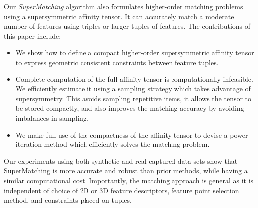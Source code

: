 Our \emph{SuperMatching} algorithm also formulates higher-order matching problems using a supersymmetric affinity tensor. It can accurately match a moderate number
of features using triples or larger tuples of features.
The contributions of this paper include:
\begin{itemize}
\item We show how to define a compact higher-order supersymmetric affinity tensor to express geometric consistent constraints between feature tuples.

\item Complete computation of the full affinity tensor is computationally infeasible. We efficiently estimate it using a sampling strategy which takes advantage of supersymmetry. This avoids sampling repetitive items, it allows the tensor to be stored compactly, and also improves the matching accuracy by avoiding imbalances in sampling.

\item We make full use of the compactness of the affinity tensor to devise a power iteration method which efficiently solves the matching problem.
\end{itemize}

Our experiments using both synthetic and real captured data sets show that SuperMatching is more accurate and robust than prior methods,
while having a similar computational cost.
Importantly, the matching approach is general as it is independent of choice of 2D or 3D feature descriptors, feature point selection method, and constraints placed on tuples.
